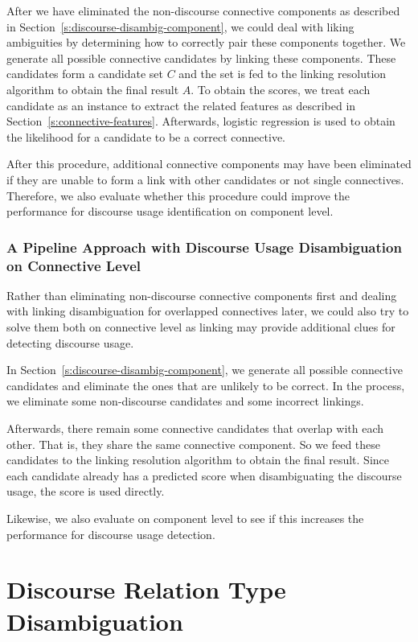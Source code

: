 After we have eliminated the non-discourse connective components as described
in Section~\ref{s:discourse-disambig-component}, we could
deal with liking ambiguities by determining how to correctly pair these
components together. We generate all possible connective candidates by
linking these components. These candidates form a candidate set $ C $ and the set is
fed to the linking resolution algorithm to obtain the final result $ A $.
To obtain the scores, we treat each candidate as an instance to
extract the related features as described in Section~\ref{s:connective-features}.
Afterwards, logistic regression is used to obtain the likelihood for a
candidate to be a correct connective.

After this procedure, additional connective components may have been eliminated if
they are unable to form a link with other candidates or not single connectives.
Therefore, we also evaluate whether this procedure could improve the performance
for discourse usage identification on component level.


\subsubsection{A Pipeline Approach with Discourse Usage Disambiguation on Connective Level}
\label{s:pipeline2}

Rather than eliminating non-discourse connective components first and
dealing with linking disambiguation for overlapped connectives later,
we could also try to solve them both on connective level as linking may
provide additional clues for detecting discourse usage. 

In Section~\ref{s:discourse-disambig-component}, we generate all possible
connective candidates and eliminate the ones that are unlikely to be correct.
In the process, we eliminate some non-discourse candidates and some incorrect
linkings.

Afterwards, there remain some connective candidates that overlap with each other.
That is, they share the same connective component. So we feed these candidates
to the linking resolution algorithm to obtain the final result. Since each candidate
already has a predicted score when disambiguating the discourse usage, the score
is used directly.

Likewise, we also evaluate on component level to see if this increases
the performance for discourse usage detection.

\section{Discourse Relation Type Disambiguation}

